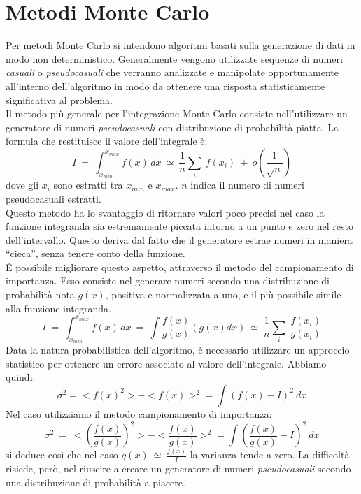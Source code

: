 
\section{Metodi Monte Carlo}
\label{sec:Monte Carlo}
Per metodi Monte Carlo si intendono algoritmi basati sulla generazione di dati in modo non deterministico.
Generalmente vengono utilizzate sequenze di numeri \emph{casuali} o \emph{pseudocasuali} che verranno analizzate e 
manipolate opportunamente all'interno dell'algoritmo in modo da ottenere una risposta statisticamente significativa al problema.\\
Il metodo più generale per l'integrazione Monte Carlo consiste nell'utilizzare un generatore di numeri \emph{pseudocasuali} con distribuzione di probabilità piatta. La formula che restituisce il valore dell'integrale è:
$$
    I \ = \ \int_{x_{min}}^{x_{max}} f(x) \, dx \ \simeq \ \frac{1}{n} \sum_i \ f(x_i) \ + \ o\left(\frac{1}{\sqrt{n}}\right)
$$
dove gli $x_i$ sono estratti tra $x_{min}$ e $x_{max}$. $n$ indica il numero di numeri pseudocasuali estratti.\\
Questo metodo ha lo svantaggio di ritornare valori poco precisi nel caso la funzione integranda sia estremamente piccata intorno a un punto e
zero nel resto dell'intervallo. Questo deriva dal fatto che il generatore estrae numeri in maniera ``cieca'', senza tenere conto della funzione.\\
È possibile migliorare questo aspetto, attraverso il metodo del campionamento di importanza. Esso consiste nel generare numeri secondo una distribuzione
di probabilità nota $g(x)$, positiva e normalizzata a uno, e il più possibile simile alla funzione integranda. 
$$
 I \ = \ \int_{x_{min}}^{x_{max}} f(x) \, dx \ = \ \int \frac{f(x)}{g(x)} \left( g(x) dx \right) \ \simeq \ \frac{1}{n} \sum_i \ \frac{f(x_i)}{g(x_i)} 
$$
Data la natura probabilistica dell'algoritmo, è necessario utilizzare un approccio statistico per ottenere un errore associato al valore dell'integrale.
Abbiamo quindi:
$$
  \sigma^2 = <{f(x)}^2> - <{f(x)}>^2 = \int (f(x) - I)^2 \ dx  
$$
Nel caso utilizziamo il metodo campionamento di importanza:
$$
\sigma^2 \ = \ <{\left(\frac{f(x)}{g(x)}\right)}^2> - <{\frac{f(x)}{g(x)}}>^2 = \int \left(\frac{f(x)}{g(x)} - I\right)^2 \ dx  
$$
si deduce così che nel caso $ g(x) \ \simeq \ \frac{f(x)}{I}$ la varianza tende a zero.
La difficoltà risiede, però, nel riuscire a creare un generatore di numeri \emph{pseudocasuali} secondo una distribuzione di probabilità a piacere.
